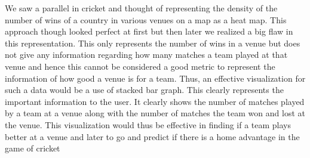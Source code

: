 \documentclass[10pt,journal,compsoc]{IEEEtran}
\begin{document}
\begin{figure}[H]
\begin{center}
\end{center}
\end{figure}

We saw a parallel in cricket and thought of representing the density of the number of wins of a country in various venues on a map as a heat map. This approach though looked perfect at first but then later we realized a big flaw in this representation. This only represents the number of wins in a venue but does not give any information regarding how many matches a team played at that venue and hence this cannot be considered a good metric to represent the information of how good a venue is for a team. Thus, an effective visualization for such a data would be a use of stacked bar graph. This clearly represents the important information to the user. It clearly shows the number of matches played by a team at a venue along with the number of matches the team won and lost at the venue. This visualization would thus be effective in finding if a team plays better at a venue and later to go and predict if there is a home advantage in the game of cricket
\end{document}
